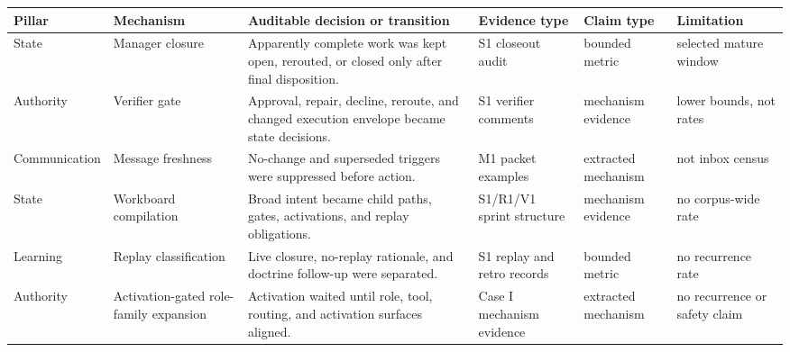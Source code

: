 \documentclass[
]{article}
\newcounter{none} %
\begin{document}
{\def\LTcaptype{none} %
\begin{longtable}[]{@{}
  >{\raggedright\arraybackslash}p{}
  >{\raggedright\arraybackslash}p{}
  >{\raggedright\arraybackslash}p{}
  >{\raggedright\arraybackslash}p{}
  >{\raggedright\arraybackslash}p{}
  >{\raggedright\arraybackslash}p{}@{}}
\toprule\noalign{}
\begin{minipage}[b]{\linewidth}\raggedright
Pillar
\end{minipage} & \begin{minipage}[b]{\linewidth}\raggedright
Mechanism
\end{minipage} & \begin{minipage}[b]{\linewidth}\raggedright
Auditable decision or transition
\end{minipage} & \begin{minipage}[b]{\linewidth}\raggedright
Evidence type
\end{minipage} & \begin{minipage}[b]{\linewidth}\raggedright
Claim type
\end{minipage} & \begin{minipage}[b]{\linewidth}\raggedright
Limitation
\end{minipage} \\
\midrule\noalign{}
\endhead
\bottomrule\noalign{}
\endlastfoot
State & Manager closure & Apparently complete work was kept open, rerouted, or closed only after final disposition. & S1 closeout audit & bounded metric & selected mature window \\
Authority & Verifier gate & Approval, repair, decline, reroute, and changed execution envelope became state decisions. & S1 verifier comments & mechanism evidence & lower bounds, not rates \\
Communication & Message freshness & No-change and superseded triggers were suppressed before action. & M1 packet examples & extracted mechanism & not inbox census \\
State & Workboard compilation & Broad intent became child paths, gates, activations, and replay obligations. & S1/R1/V1 sprint structure & mechanism evidence & no corpus-wide rate \\
Learning & Replay classification & Live closure, no-replay rationale, and doctrine follow-up were separated. & S1 replay and retro records & bounded metric & no recurrence rate \\
Authority & Activation-gated role-family expansion & Activation waited until role, tool, routing, and activation surfaces aligned. & Case I mechanism evidence & extracted mechanism & no recurrence or safety claim \\
\end{longtable}
}
\end{document}
